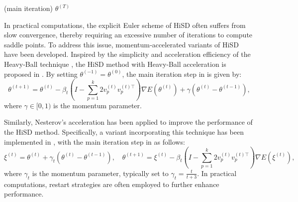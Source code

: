 \documentclass[final]{siamart251216}
\begin{document}
\begin{algorithm}[H]
\caption{Numerical algorithm of $k$-HiSD}
\begin{algorithmic}
\hfill{(main iteration)}
\ENDFOR
\ENSURE $\theta^{(T)}$
\end{algorithmic}
\label{alg:ori}
\end{algorithm}

In practical computations, the explicit Euler scheme of HiSD often suffers from slow convergence, thereby requiring an excessive number of iterations to compute saddle points. 
To address this issue, momentum‐accelerated variants of HiSD have been developed. 
Inspired by the simplicity and acceleration efficiency of the Heavy‐Ball technique \cite{Polyak1964SomeMO}, the HiSD method with Heavy‐Ball acceleration is proposed in \cite{luo2025accelerated}. 
By setting $\theta^{(-1)}=\theta^{(0)}$, the main iteration step in  is given by:
\begin{equation}\label{eqn:neavyball}
\theta^{(t+1)} = \theta^{(t)} - \beta_t
\left(I-\sum_{p=1}^k 2 v_p^{(t)}{v}_{p}^{(t){\top}}\right)
\nabla E(\theta^{(t)})+ \gamma (\theta^{(t)}-\theta^{(t-1)}),  
\end{equation}
where $\gamma \in [0, 1)$ is the momentum parameter. 

Similarly, Nesterov's acceleration \cite{Nesterov1983} has been applied to improve the performance of the HiSD method.
Specifically, a variant incorporating this technique has been implemented in \cite{liu2024neural}, with the main iteration step in  as follows:
\begin{equation*}
\xi^{(t)} =\theta^{(t)}+\gamma_t \left(\theta^{(t)}-\theta^{(t-1)}\right),
\quad
\theta^{(t+1)} = \xi^{(t)} - \beta_t
\left(I-\sum_{p=1}^k 2 v_p^{(t)}{v}_{p}^{(t){\top}}\right)
\nabla E(\xi^{(t)}),
\end{equation*}
where $\gamma_t$ is the momentum parameter, typically set to $\gamma_t=\frac{t}{t+3}$. 
In practical computations, restart strategies are often employed to further enhance performance.
\end{document}
